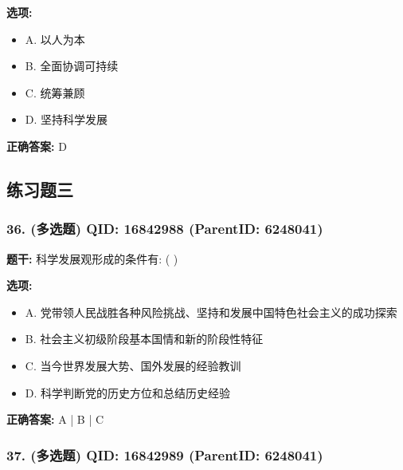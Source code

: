\documentclass[12pt,UTF8]{ctexart}
\begin{document}
\textbf{选项:}
\begin{itemize}[leftmargin=*]

  \item A. 以人为本

  \item B. 全面协调可持续

  \item C. 统筹兼顾

  \item D. 坚持科学发展

\end{itemize}

\textbf{正确答案:}
D

\vspace{0.3em}\hrulefill\vspace{0.7em}

\subsection*{练习题三}

\subsubsection*{36. (多选题) \small QID: 16842988 (ParentID: 6248041)}

\textbf{题干:}
科学发展观形成的条件有: ( )



\textbf{选项:}
\begin{itemize}[leftmargin=*]

  \item A. 党带领人民战胜各种风险挑战、坚持和发展中国特色社会主义的成功探索

  \item B. 社会主义初级阶段基本国情和新的阶段性特征

  \item C. 当今世界发展大势、国外发展的经验教训

  \item D. 科学判断党的历史方位和总结历史经验

\end{itemize}

\textbf{正确答案:}
A | B | C

\vspace{0.3em}\hrulefill\vspace{0.7em}

\subsubsection*{37. (多选题) \small QID: 16842989 (ParentID: 6248041)}
\end{document}
